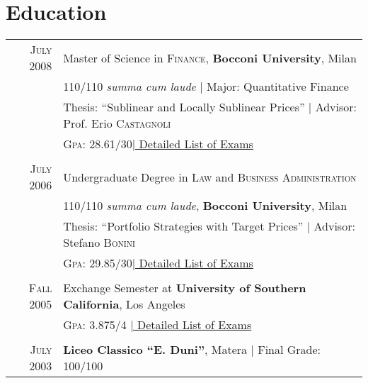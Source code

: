 \documentclass[a4paper,10pt]{article}
\begin{document}
\section{Education}
\begin{tabular}{rl}
  \textsc{July} 2008 & Master of Science in \textsc{Finance}, \textbf{Bocconi University}, Milan                              \\
                     & 110/110 \small\emph{summa cum laude} | Major: Quantitative Finance                                     \\
                     & Thesis: ``Sublinear and Locally Sublinear Prices'' | \small Advisor: Prof. Erio \textsc{Castagnoli}    \\
                     & \normalsize \textsc{Gpa}: 28.61/30\hyperlink{grds}{\hfill | \footnotesize Detailed List of Exams}      \\
                     &                                                                                                        \\
  \textsc{July} 2006 & Undergraduate Degree in \textsc{Law} and \textsc{Business Administration}                              \\
                     & 110/110 \small\emph{summa cum laude}, \normalsize\textbf{Bocconi University}, Milan                    \\
                     & Thesis: ``Portfolio Strategies with Target Prices'' | \small Advisor: Stefano \textsc{Bonini}          \\
                     & \normalsize \textsc{Gpa}: 29.85/30\hyperlink{grds_cleli}{\hfill| \footnotesize Detailed List of Exams} \\
                     &                                                                                                        \\
  \textsc{Fall} 2005 & Exchange Semester at \textbf{University of Southern California}, Los Angeles                           \\
                     & \textsc{Gpa}: 3.875/4 \hyperlink{grds_usc}{\hfill| \footnotesize Detailed List of Exams}               \\
                     &                                                                                                        \\
  \textsc{July} 2003 & \textbf{Liceo Classico ``E. Duni''}, Matera | Final Grade: 100/100
\end{tabular}
\end{document}
